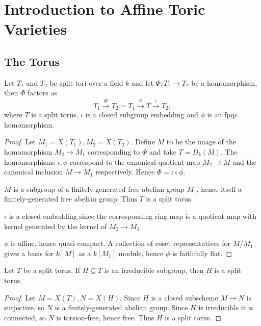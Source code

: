 \section{Introduction to Affine Toric Varieties}


\subsection{The Torus}


\begin{proposition}
  \label{1-1-1-group-hom-subtorus} %

  Let $T_1$ and $T_2$ be split tori over a field $k$ and let $\Phi: T_1 \to T_2$ be a homomorphism,
  then $\Phi$ factors as
  \[
    T_1 \xrightarrow{\Phi} T_2 = T_1 \xrightarrow{\phi} T \xrightarrow{\iota} T_2,
  \]
  where $T$ is a split torus, $\iota$ is a closed subgroup embedding and $\phi$ is an fpqc homomorphism.
\end{proposition}
\begin{proof}
  Let $M_1=X(T_1), M_2=X(T_2)$. Define $M$ to be the image of the homomorphism $M_2 \to M_1$
  corresponding to $\Phi$ and take $T = D_k(M)$. The homomorphisms $\iota,\phi$ correspond to the
  canonical quotient map $M_2 \to M$ and the canonical inclusion $M \to M_1$ respectively.
  Hence $\Phi = \iota\circ\phi$.

  $M$ is a subgroup of a finitely-generated free abelian group $M_1$,
  hence itself a finitely-generated free abelian group. Thus $T$ is a split torus.

  $\iota$ is a closed embedding since the corresponding ring map is a quotient map with kernel
  generated by the kernel of $M_2 \to M_1$.

  $\phi$ is affine, hence quasi-compact. A collection of coset representatives for $M /M_1$
  gives a basis for $k[M]$ as a $k[M_1]$ module, hence $\phi$ is faithfully flat.
\end{proof}


\begin{proposition}
  \label{1-1-1-subgroup-subtorus}

  Let $T$ be a split torus.
  If $H \subseteq T$ is an irreducible subgroup, then $H$ is a split torus.
\end{proposition}
\begin{proof}

  Let $M = X(T), N=X(H)$. Since $H$ is a closed subscheme $M \to N$ is surjective,
  so $N$ is a finitely-generated abelian group. Since $H$ is irreducible it is connected,
  so $N$ is torsion-free, hence free. Thus $H$ is a split torus.
\end{proof}


